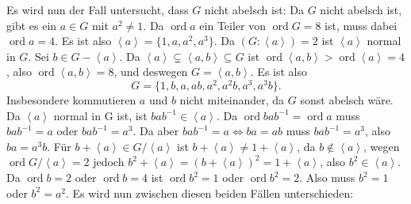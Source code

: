 \documentclass[a4paper,10pt]{article}
\theoremstyle{definition}
\newcommand{\ord}{\operatorname{ord}}
\newcommand{\gen}[1]{\left\langle#1\right\rangle}
\begin{document}
Es wird nun der Fall untersucht, dass $G$ nicht abelsch ist: Da $G$ nicht abelsch ist, gibt es ein $a \in G$ mit $a^2 \neq 1$. Da $\ord a$ ein Teiler von $\ord G = 8$ ist, muss dabei $\ord a = 4$. Es ist also $\gen{a} = \{1, a, a^2, a^3\}$. Da $(G : \gen{a}) = 2$ ist $\gen{a}$ normal in $G$. Sei $b \in G-\gen{a}$. Da $\gen{a} \subsetneq \gen{a,b} \subseteq G$ ist $\ord \gen{a,b} > \ord \gen{a} = 4$, also $\ord \gen{a,b} = 8$, und deswegen $G = \gen{a,b}$. Es ist also
\[
 G = \{1, b, a, ab, a^2, a^2 b, a^3, a^3 b\}.
\]
Insbesondere kommutieren $a$ und $b$ nicht miteinander, da $G$ sonst abelsch wäre. Da $\gen{a}$ normal in G ist, ist $bab^{-1} \in \gen{a}$. Da $\ord bab^{-1}  = \ord a$ muss $bab^{-1} = a$ oder $bab^{-1} = a^3$. Da aber $bab^{-1} = a \Leftrightarrow ba = ab$ muss $bab^{-1} = a^3$, also $ba = a^3 b$. Für $b+\gen{a} \in G/\!\gen{a}$ ist $b+\gen{a} \neq 1+\gen{a}$, da $b \not\in \gen{a}$, wegen $\ord G/\!\gen{a} = 2$ jedoch $b^2 + \gen{a} = (b+\gen{a})^2 = 1+\gen{a}$, also $b^2 \in \gen{a}$. Da $\ord b = 2$ oder $\ord b = 4$ ist $\ord b^2 = 1$ oder $\ord b^2 = 2$. Also muss $b^2 = 1$ oder $b^2 = a^2$. Es wird nun zwischen diesen beiden Fällen unterschieden:
\end{document}
